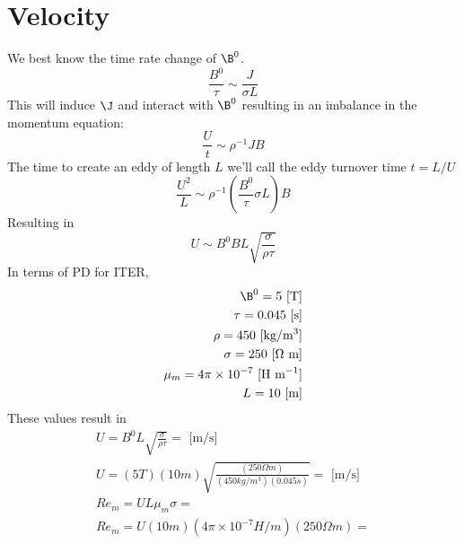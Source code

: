 \documentclass[11pt]{article}
\begin{document}
\doublespacing
\MOONSTITLE
\maketitle

\section{Velocity}
We best know the time rate change of $\B^0$.
\begin{equation}
	\frac{B^0}{\tau} \sim \frac{J}{\sigma L}
\end{equation}
This will induce $\J$ and interact with $\B^0$ resulting in an imbalance in the momentum equation:
\begin{equation}
	\frac{U}{t} \sim \rho^{-1} J B
\end{equation}
The time to create an eddy of length $L$ we'll call the eddy turnover time $t=L/U$
\begin{equation}
	\frac{U^2}{L} \sim \rho^{-1} \left(\frac{B^0}{\tau} \sigma L \right) B
\end{equation}
Resulting in
\begin{equation}
	U \sim {B^0} B L \sqrt{\frac{\sigma}{\rho \tau}}
\end{equation}
In terms of PD for ITER,
\begin{equation}\begin{aligned}
	\B^0 = 5 \text{ [T]} \\
	\tau = 0.045 \text{ [s]} \\
	\rho = 450 \text{ [kg/m$^3$]} \\
	\sigma = 250 \text{ [$\Omega$ m]} \\
	\mu_m = 4 \pi \times 10^{-7} \text{ [H m$^{-1}$]} \\
	L = 10 \text{ [m]} \\
\end{aligned}\end{equation}
These values result in
\begin{equation}\begin{aligned}
	U = B^0 L \sqrt{\frac{\sigma}{\rho \tau}} = \text{ [m/s]} \\
	U = (5 T) (10 m) \sqrt{\frac{(250 \Omega m)}{(450 kg/m^3) (0.045 s)}} = \text{ [m/s]} \\
	Re_m = U L \mu_m \sigma =  \\
	Re_m = U (10 m) (4 \pi \times 10^{-7} H/m) (250 \Omega m) =  \\
\end{aligned}\end{equation}
\end{document}
